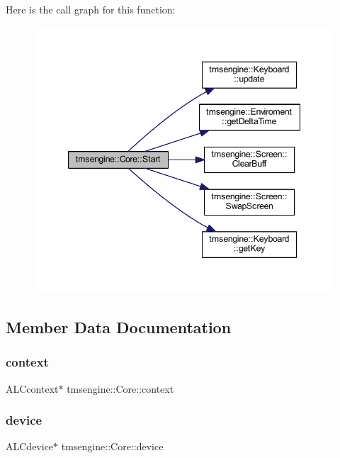 Here is the call graph for this function\+:\nopagebreak
\begin{figure}[H]
\begin{center}
\leavevmode
\includegraphics[width=347pt]{classtmsengine_1_1_core_af5819357f7cfe0674d4410a606dda3ac_cgraph}
\end{center}
\end{figure}


\subsection{Member Data Documentation}
\mbox{\label{classtmsengine_1_1_core_a7fc87c5ea5b9b682b8dddef5360e109f}} 
\subsubsection{\texorpdfstring{context}{context}}
{\footnotesize\ttfamily A\+L\+Ccontext$\ast$ tmsengine\+::\+Core\+::context\hspace{0.3cm}{\ttfamily [private]}}

\mbox{\label{classtmsengine_1_1_core_a91929ead4dc4bbf21e54e06f1d80408b}} 
\subsubsection{\texorpdfstring{device}{device}}
{\footnotesize\ttfamily A\+L\+Cdevice$\ast$ tmsengine\+::\+Core\+::device\hspace{0.3cm}{\ttfamily [private]}}

